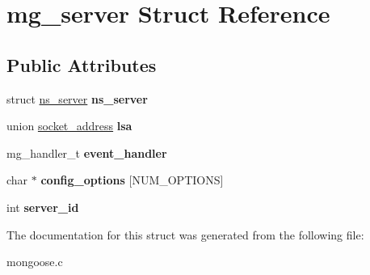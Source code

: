 \hypertarget{structmg__server}{\section{mg\-\_\-server Struct Reference}
\label{structmg__server}
}
\subsection*{Public Attributes}
\begin{DoxyCompactItemize}
\item 
\hypertarget{structmg__server_aae82596eb59f601ae99ef20f23c12017}{struct \hyperlink{structns__server}{ns\-\_\-server} {\bfseries ns\-\_\-server}}\label{structmg__server_aae82596eb59f601ae99ef20f23c12017}

\item 
\hypertarget{structmg__server_acbc9c742af372629b15619508931d1c5}{union \hyperlink{unionsocket__address}{socket\-\_\-address} {\bfseries lsa}}\label{structmg__server_acbc9c742af372629b15619508931d1c5}

\item 
\hypertarget{structmg__server_af5d370b4300b218d63d7c6a7b4a7791d}{mg\-\_\-handler\-\_\-t {\bfseries event\-\_\-handler}}\label{structmg__server_af5d370b4300b218d63d7c6a7b4a7791d}

\item 
\hypertarget{structmg__server_a873aee94660c99fb7b4a8a872636f619}{char $\ast$ {\bfseries config\-\_\-options} \mbox{[}N\-U\-M\-\_\-\-O\-P\-T\-I\-O\-N\-S\mbox{]}}\label{structmg__server_a873aee94660c99fb7b4a8a872636f619}

\item 
\hypertarget{structmg__server_aa3a9d6adc14027a93c2f3b4288dad82c}{int {\bfseries server\-\_\-id}}\label{structmg__server_aa3a9d6adc14027a93c2f3b4288dad82c}

\end{DoxyCompactItemize}


The documentation for this struct was generated from the following file\-:\begin{DoxyCompactItemize}
\item 
mongoose.\-c\end{DoxyCompactItemize}
